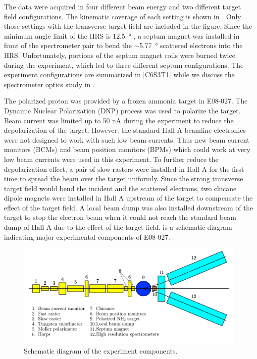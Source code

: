 The data were acquired in four different beam energy and two different target field configurations. The kinematic coverage of each setting is shown in . Only those settings with the transverse target field are included in the figure. Since the minimum angle limit of the HRS is \SI{12.5}{\degree} \cite{Alcorn2004}, a septum magnet was installed in front of the spectrometer pair to bend the $\sim$\SI{5.77}{\degree} scattered electrons into the HRS. Unfortunately, portions of the septum magnet coils were burned twice during the experiment, which led to three different septum configurations. The experiment configurations are summarized in \cref{C6S3T1} while we discuss the spectrometer optics study in .

The polarized proton was provided by a frozen ammonia target in E08-027. The Dynamic Nuclear Polarization (DNP) process was used to polarize the target. Beam current was limited up to 50 nA during the experiment to reduce the depolarization of the target. However, the standard Hall A beamline electronics were not designed to work with such low beam currents. Thus new beam current monitors (BCMs) and beam position monitors (BPMs) which could work at very low beam currents were used in this experiment. To further reduce the depolarization effect, a pair of slow rasters were installed in Hall A for the first time to spread the beam over the target uniformly. Since the strong transverse target field would bend the incident and the scattered electrons, two chicane dipole magnets were installed in Hall A upstream of the target to compensate the effect of the target field. A local beam dump was also installed downstream of the target to stop the electron beam when it could not reach the standard beam dump of Hall A due to the effect of the target field.  is a schematic diagram indicating major experimental components of E08-027.

\begin{figure}[tb!]
  \centering
  \includegraphics[width=\textwidth]{figs/experiment-setup.png}
  \caption[Schematic diagram of the experiment components.]{Schematic diagram of the experiment components. \label{C5F2}}
\end{figure}

